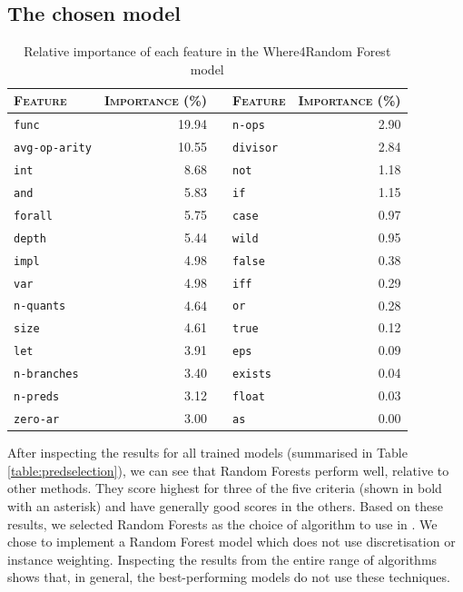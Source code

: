 \subsection{The chosen model}
\label{sec:chosen}


\begin{table}
	\caption[Relative importance of features for \where]{Relative importance of each feature in the \textsf{Where4}Random Forest model}
	
	
	\begin{tabularx}{\textwidth}{@{}lr|c|lr@{}}
		\toprule
		\textsc{Feature} & \textsc{Importance (\%)} & & 
		\textsc{Feature} & \textsc{Importance (\%)}  \\
		\midrule
		\texttt{func} & 19.94 & & \texttt{n-ops} & 2.90 \\
		\texttt{avg-op-arity} &  10.55 & & \texttt{divisor} & 2.84 \\
		\texttt{int} & 8.68 & & \texttt{not} & 1.18 \\
		\texttt{and} & 5.83 & & \texttt{if} & 1.15 \\
		\texttt{forall} & 5.75 & & \texttt{case} & 0.97 \\
		\texttt{depth} & 5.44 & & \texttt{wild} & 0.95 \\
		\texttt{impl} & 4.98 & & \texttt{false} & 0.38 \\
		\texttt{var} & 4.98 & & \texttt{iff} & 0.29 \\
		\texttt{n-quants} & 4.64 & & \texttt{or} & 0.28 \\
		\texttt{size} & 4.61 & & \texttt{true} & 0.12 \\
		\texttt{let} & 3.91 & & \texttt{eps} & 0.09 \\
		\texttt{n-branches} & 3.40 & & \texttt{exists} & 0.04 \\
		\texttt{n-preds} & 3.12 & & \texttt{float} & 0.03 \\
		\texttt{zero-ar} & 3.00 & & \texttt{as} & 0.00 \\
		\bottomrule	
	\end{tabularx}
	\label{table:importances}
\end{table}


After inspecting the results for all trained models (summarised in Table \ref{table:predselection}), we can see that Random Forests \cite{RandomForests} perform well, relative to other methods. 
They score highest for three of the five criteria (shown in bold with an asterisk) and have generally good scores in the others.
Based on these results, we selected Random Forests as the choice of algorithm to use in \where.
We chose to implement a Random Forest model which does not use discretisation or instance weighting. 
Inspecting the results from the entire range of algorithms shows that, in general, the best-performing models do not use these techniques.

